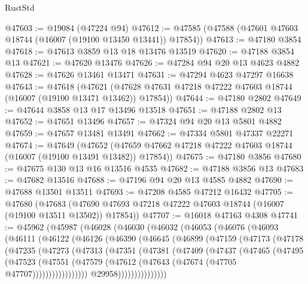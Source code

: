 \begin{lexlean}{RustStd}
\begin{coremodule}
@47603 := @19084 (@47224 @94)
@47612 := @47585 (@47588 (@47601 @47603 @18744 (@16007 (@19100 @13450 @13441)) @17854))
@47613 := @47180 @3854
@47618 := @47613 @3859 @13 @18 @13476 @13519
@47620 := @47188 @3854 @13
@47621 := @47620 @13476
@47626 := @47284 @94 @20 @13 @4623 @4882
@47628 := @47626 @13461 @13471
@47631 := @47294 @4623 @47297 @16638
@47643 := @47618
    (@47621 (@47628 @47631 @47218 @47222 @47603 @18744 (@16007 (@19100 @13471 @13462)) @17854))
@47644 := @47180 @2802
@47649 := @47644 @3858 @13 @17 @13496 @13518
@47651 := @47188 @2802 @13
@47652 := @47651 @13496
@47657 := @47324 @94 @20 @13 @5801 @4882
@47659 := @47657 @13481 @13491
@47662 := @47334 @5801 @47337 @22271
@47674 := @47649
    (@47652 (@47659 @47662 @47218 @47222 @47603 @18744 (@16007 (@19100 @13491 @13482)) @17854))
@47675 := @47180 @3856
@47680 := @47675 @130 @13 @16 @13516 @4535
@47682 := @47188 @3856 @13
@47683 := @47682 @13516
@47688 := @47196 @94 @20 @13 @4585 @4882
@47690 := @47688 @13501 @13511
@47693 := @47208 @4585 @47212 @16432
@47705 := @47680
    (@47683 (@47690 @47693 @47218 @47222 @47603 @18744 (@16007 (@19100 @13511 @13502)) @17854))
@47707 := @16018 @47163 @4308
@47741 := @45962
    (@45987
      (@46028
        (@46030
          (@46032
            (@46053
              (@46076
                (@46093
                  (@46111
                    (@46122
                      (@46126
                        (@46390
                          (@46645
                            (@46899
                              (@47159
                                (@47173
                                  (@47178
                                    (@47235
                                      (@47273
                                        (@47313
                                          (@47351
                                            (@47381
                                              (@47409
                                                (@47437
                                                  (@47465
                                                    (@47495
                                                      (@47523
                                                        (@47551
                                                          (@47579
                                                            (@47612
                                                              (@47643
                                                                (@47674
                                                                  (@47705 @47707)))))))))))))))))
                                  @29958)))))))))))))))

\end{coremodule}
\end{lexlean}
